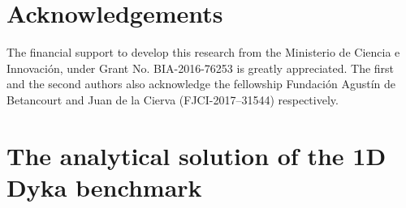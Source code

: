\documentclass[preprint,12pt,a4paper]{elsarticle}
\begin{document}
% 
\section*{Acknowledgements}
%
The financial support to develop this research from the Ministerio de Ciencia e Innovaci\'on, under Grant No. BIA-2016-76253 is greatly appreciated. The first and the second authors also acknowledge the fellowship Fundaci\'on Agust\'in de Betancourt and Juan de la Cierva (FJCI-2017–31544) respectively.


\printglossaries

\appendix

\section{The analytical solution of the 1D Dyka benchmark}
\label{app:analytical_sol}
\end{document}
